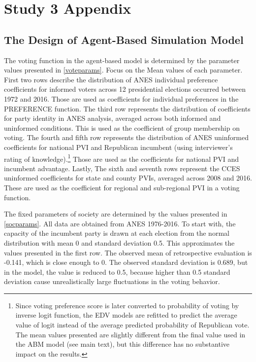 \clearpage
\section{Study 3 Appendix} \label{appC}
\setcounter{table}{0}
\renewcommand{\thetable}{C\arabic{table}}
\setcounter{figure}{0}
\renewcommand{\thefigure}{C\arabic{figure}}

\subsection{The Design of Agent-Based Simulation Model}



\par The voting function in the agent-based model is determined by the parameter values presented in \autoref{voteparams}. Focus on the Mean values of each parameter. First two rows describe the distribution of ANES individual preference coefficients for informed voters across 12 presidential elections occurred between 1972 and 2016. Those are used as coefficients for individual preferences in the PREFERENCE function. The third row represents the distribution of coefficients for party identity in ANES analysis, averaged across both informed and uninformed conditions. This is used as the coefficient of group membership on voting. The fourth and fifth row represents the distribution of ANES uninformed  coefficients for national PVI and Republican incumbent (using interviewer's rating of knowledge).\footnote{Since voting preference score is later converted to probability of voting by inverse logit function,  the EDV models are refitted to predict the average value of logit instead of the average predicted probability of Republican vote. The mean values presented are slightly different from the final value used in the ABM model (see main text), but this difference has no substantive impact on the results.}  Those are used as the coefficients for national PVI and incumbent advantage. Lastly, The sixth and seventh rows represent the CCES uninformed coefficients for state and county PVIs, averaged across 2008 and 2016. These are used as the coefficient for regional and sub-regional PVI in a voting function.      



\par The fixed parameters of society are determined by the values presented in \autoref{socparams}. All data are obtained from ANES 1976-2016. To start with, the capacity of the incumbent party is drawn at each election from the normal distribution with mean 0 and standard deviation 0.5. This approximates the values presented in the first row. The observed mean of retrospective evaluation is -0.141, which is close enough to 0. The observed standard deviation is 0.689, but in the model, the value is reduced to 0.5, because higher than 0.5 standard deviation cause unrealistically large fluctuations in the voting behavior. 

